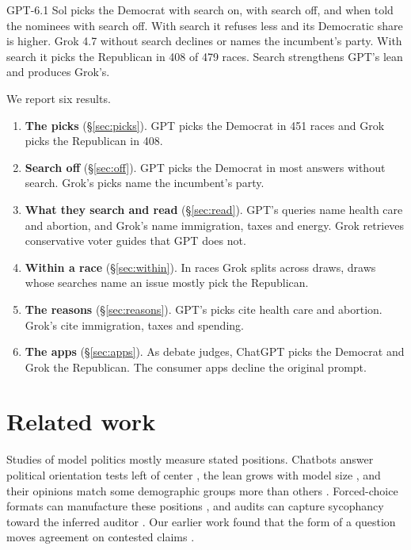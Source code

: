 \documentclass[11pt]{article}
\begin{document}
GPT-6.1 Sol picks the Democrat with search on, with search off, and when told the nominees with search off. With
search it refuses less and its Democratic share is higher. Grok 4.7 without search declines
or names the incumbent's party. With search it picks the Republican in 408 of 479 races. Search
strengthens GPT's lean and produces Grok's.

We report six results.
\begin{enumerate}\setlength{\itemsep}{0pt}
\item \textbf{The picks} (\S\ref{sec:picks}). GPT picks the Democrat in 451 races and Grok
picks the Republican in 408.
\item \textbf{Search off} (\S\ref{sec:off}). GPT picks the Democrat in most answers without
search. Grok's picks name the incumbent's party.
\item \textbf{What they search and read} (\S\ref{sec:read}). GPT's queries name health care
and abortion, and Grok's name immigration, taxes and energy. Grok retrieves conservative voter
guides that GPT does not.
\item \textbf{Within a race} (\S\ref{sec:within}). In races Grok splits across draws,
draws whose searches name an issue mostly pick the Republican.
\item \textbf{The reasons} (\S\ref{sec:reasons}). GPT's picks cite health care and abortion.
Grok's cite immigration, taxes and spending.
\item \textbf{The apps} (\S\ref{sec:apps}). As debate judges, ChatGPT picks the Democrat and
Grok the Republican. The consumer apps decline the original prompt.
\end{enumerate}

\section{Related work}
\label{sec:related}

Studies of model politics mostly measure stated positions. Chatbots answer political orientation
tests left of center \citep{hartmann2023ideology,rozado2024preferences}, the lean grows with model
size \citep{exler2025large}, and their opinions match some demographic groups more than others
\citep{santurkar2023whose}. Forced-choice formats can manufacture these positions
\citep{rottger2024compass}, and audits can capture sycophancy toward the inferred auditor
\citep{tornberg2026audits}. Our earlier work found that the form of a question moves agreement on
contested claims \citep{parikh2026tags}.
\end{document}
